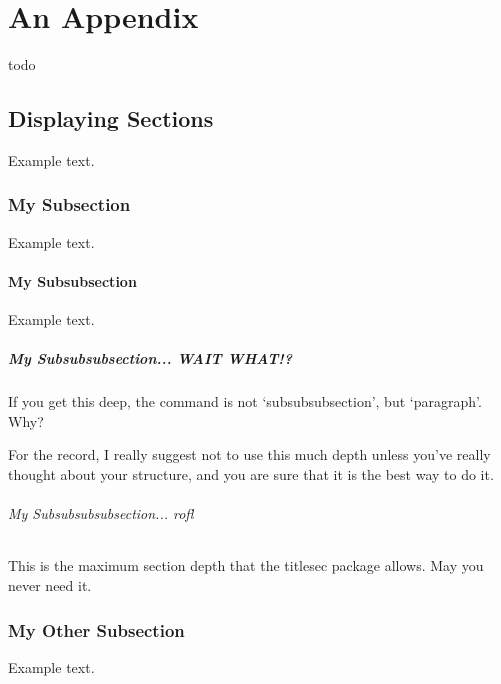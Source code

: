 \chapter{An Appendix}
todo

\section{Displaying Sections}
Example text.

\clearpage

\subsection{My Subsection}
Example text.


\subsubsection{My Subsubsection}
Example text.

\clearpage

\paragraph{My Subsubsubsection... WAIT WHAT!?}
If you get this deep, the command is not `subsubsubsection', but `paragraph'. Why?

For the record, I really suggest not to use this much depth unless you've really thought about your structure, and you are sure that it is the best way to do it.

\subparagraph{My Subsubsubsubsection... rofl}
This is the maximum section depth that the titlesec package allows. May you never need it.


\subsection{My Other Subsection}
Example text.


